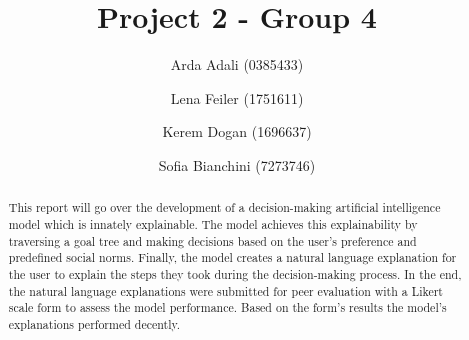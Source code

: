 \documentclass[sigconf,nonacm]{acmart}
\begin{document}
\title{Project 2 - Group 4}


\author{Arda Adali (0385433)}

\author{Lena Feiler (1751611)}

\author{Kerem Dogan (1696637)}

\author{Sofia Bianchini (7273746)}


\renewcommand{\shortauthors}{Trovato et al.}

\begin{abstract}
This report will go over the development of a decision-making artificial intelligence model which is innately explainable. The model achieves this explainability by traversing a goal tree and making decisions based on the user's preference and predefined social norms. Finally, the model creates a natural language explanation for the user to explain the steps they took during the decision-making process. In the end, the natural language explanations were submitted for peer evaluation with a Likert scale form to assess the model performance. Based on the form's results the model's explanations performed decently.
\end{abstract}
\end{document}
